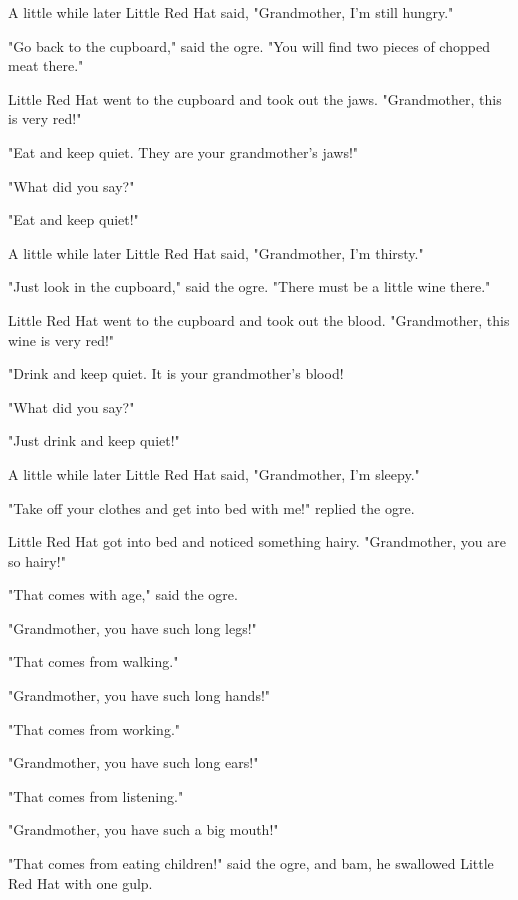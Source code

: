 A little while later Little Red Hat said, "Grandmother, I'm still hungry."

"Go back to the cupboard," said the ogre. "You will find two pieces of chopped meat there."

Little Red Hat went to the cupboard and took out the jaws. "Grandmother, this is very red!"

"Eat and keep quiet. They are your grandmother's jaws!"

"What did you say?"

"Eat and keep quiet!"

A little while later Little Red Hat said, "Grandmother, I'm thirsty."

"Just look in the cupboard," said the ogre. "There must be a little wine there."

Little Red Hat went to the cupboard and took out the blood. "Grandmother, this wine is very red!"

"Drink and keep quiet. It is your grandmother's blood!

"What did you say?"

"Just drink and keep quiet!"

A little while later Little Red Hat said, "Grandmother, I'm sleepy."

"Take off your clothes and get into bed with me!" replied the ogre.

Little Red Hat got into bed and noticed something hairy. "Grandmother, you are so hairy!"

"That comes with age," said the ogre.

"Grandmother, you have such long legs!"

"That comes from walking."

"Grandmother, you have such long hands!"

"That comes from working."

"Grandmother, you have such long ears!"

"That comes from listening."

"Grandmother, you have such a big mouth!"

"That comes from eating children!" said the ogre, and bam, he swallowed Little Red Hat with one gulp.
